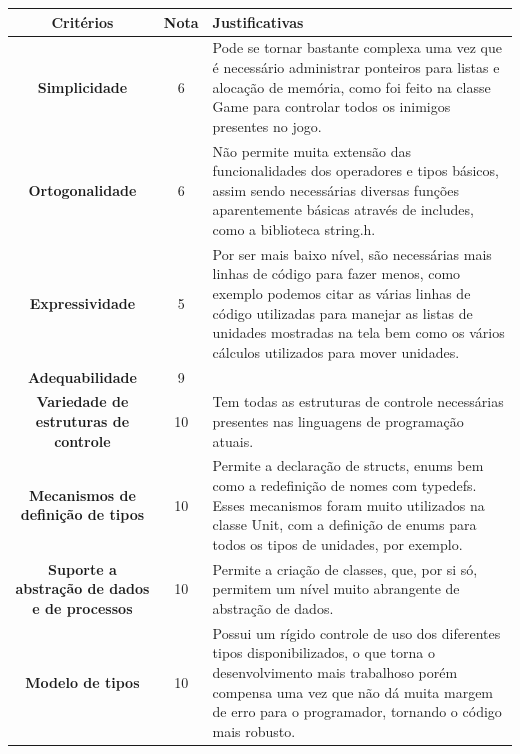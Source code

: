\documentclass[rel_mlp]{iiufrgs}
\begin{document}
 \begin{center}
\begin{tabular}{ |c|c|p{80mm} } 
\hline
	\textbf{Critérios} & \textbf{Nota} & \textbf{Justificativas} \\
\hline
\textbf{Simplicidade} & 6 & Pode se tornar bastante complexa uma vez que é necessário administrar ponteiros para listas e alocação de memória, como foi feito na classe Game para controlar todos os inimigos presentes no jogo.\\ 
\textbf{Ortogonalidade} & 6 & Não permite muita extensão das funcionalidades dos operadores e tipos básicos, assim sendo necessárias diversas funções aparentemente básicas através de includes, como a biblioteca string.h.\\ 
\textbf{Expressividade} & 5 & Por ser mais baixo nível, são necessárias mais linhas de código para fazer menos, como exemplo podemos citar as várias linhas de código utilizadas para manejar as listas de unidades mostradas na tela bem como os vários cálculos utilizados para mover unidades. \\ 
\textbf{Adequabilidade} & 9 &  \\
\textbf{Variedade de estruturas de controle} & 10 & Tem todas as estruturas de controle necessárias presentes nas linguagens de programação atuais. \\
\textbf{Mecanismos de definição de tipos} & 10 & Permite a declaração de structs, enums bem como a redefinição de nomes com typedefs. Esses mecanismos foram muito utilizados na classe Unit, com a definição de enums para todos os tipos de unidades, por exemplo.\\
\textbf{Suporte a abstração de dados e de processos} & 10 & Permite a criação de classes, que, por si só, permitem um nível muito abrangente de abstração de dados. \\
\textbf{Modelo de tipos} & 10 & Possui um rígido controle de uso dos diferentes tipos disponibilizados, o que torna o desenvolvimento mais trabalhoso porém compensa uma vez que não dá muita margem de erro para o programador, tornando o código mais robusto.\\
\hline
\end{tabular}
\end{center}
\end{document}
